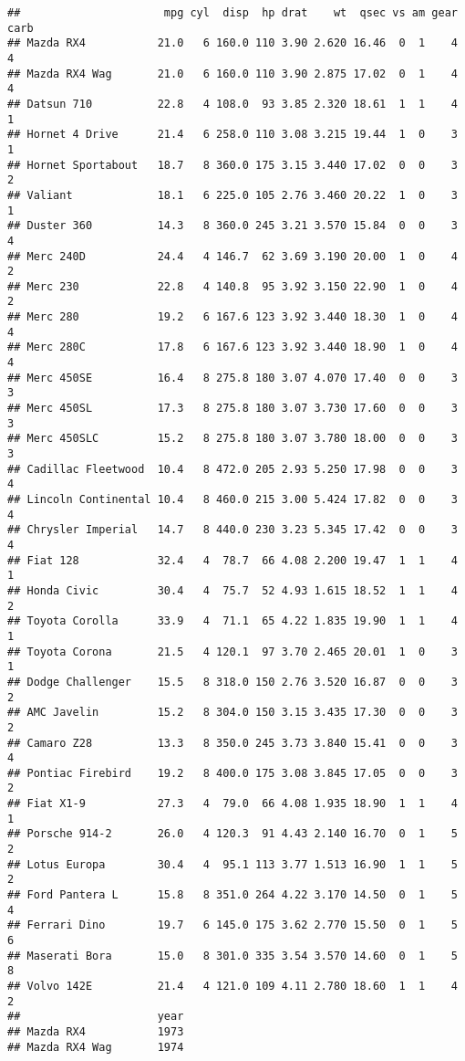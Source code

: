 \documentclass[]{article}
\begin{document}
\begin{verbatim}
##                      mpg cyl  disp  hp drat    wt  qsec vs am gear carb
## Mazda RX4           21.0   6 160.0 110 3.90 2.620 16.46  0  1    4    4
## Mazda RX4 Wag       21.0   6 160.0 110 3.90 2.875 17.02  0  1    4    4
## Datsun 710          22.8   4 108.0  93 3.85 2.320 18.61  1  1    4    1
## Hornet 4 Drive      21.4   6 258.0 110 3.08 3.215 19.44  1  0    3    1
## Hornet Sportabout   18.7   8 360.0 175 3.15 3.440 17.02  0  0    3    2
## Valiant             18.1   6 225.0 105 2.76 3.460 20.22  1  0    3    1
## Duster 360          14.3   8 360.0 245 3.21 3.570 15.84  0  0    3    4
## Merc 240D           24.4   4 146.7  62 3.69 3.190 20.00  1  0    4    2
## Merc 230            22.8   4 140.8  95 3.92 3.150 22.90  1  0    4    2
## Merc 280            19.2   6 167.6 123 3.92 3.440 18.30  1  0    4    4
## Merc 280C           17.8   6 167.6 123 3.92 3.440 18.90  1  0    4    4
## Merc 450SE          16.4   8 275.8 180 3.07 4.070 17.40  0  0    3    3
## Merc 450SL          17.3   8 275.8 180 3.07 3.730 17.60  0  0    3    3
## Merc 450SLC         15.2   8 275.8 180 3.07 3.780 18.00  0  0    3    3
## Cadillac Fleetwood  10.4   8 472.0 205 2.93 5.250 17.98  0  0    3    4
## Lincoln Continental 10.4   8 460.0 215 3.00 5.424 17.82  0  0    3    4
## Chrysler Imperial   14.7   8 440.0 230 3.23 5.345 17.42  0  0    3    4
## Fiat 128            32.4   4  78.7  66 4.08 2.200 19.47  1  1    4    1
## Honda Civic         30.4   4  75.7  52 4.93 1.615 18.52  1  1    4    2
## Toyota Corolla      33.9   4  71.1  65 4.22 1.835 19.90  1  1    4    1
## Toyota Corona       21.5   4 120.1  97 3.70 2.465 20.01  1  0    3    1
## Dodge Challenger    15.5   8 318.0 150 2.76 3.520 16.87  0  0    3    2
## AMC Javelin         15.2   8 304.0 150 3.15 3.435 17.30  0  0    3    2
## Camaro Z28          13.3   8 350.0 245 3.73 3.840 15.41  0  0    3    4
## Pontiac Firebird    19.2   8 400.0 175 3.08 3.845 17.05  0  0    3    2
## Fiat X1-9           27.3   4  79.0  66 4.08 1.935 18.90  1  1    4    1
## Porsche 914-2       26.0   4 120.3  91 4.43 2.140 16.70  0  1    5    2
## Lotus Europa        30.4   4  95.1 113 3.77 1.513 16.90  1  1    5    2
## Ford Pantera L      15.8   8 351.0 264 4.22 3.170 14.50  0  1    5    4
## Ferrari Dino        19.7   6 145.0 175 3.62 2.770 15.50  0  1    5    6
## Maserati Bora       15.0   8 301.0 335 3.54 3.570 14.60  0  1    5    8
## Volvo 142E          21.4   4 121.0 109 4.11 2.780 18.60  1  1    4    2
##                     year
## Mazda RX4           1973
## Mazda RX4 Wag       1974

\end{verbatim}
\end{document}
